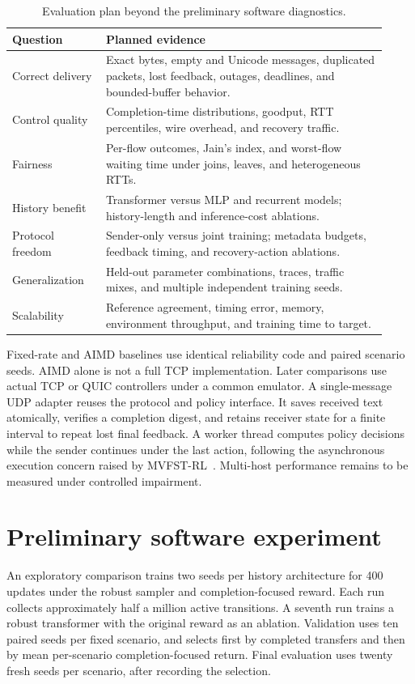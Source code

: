 \documentclass[11pt]{article}
\begin{document}
\begin{table}[ht]
\centering
\small
\begin{tabular}{@{}p{0.23\linewidth}p{0.69\linewidth}@{}}
\toprule
Question & Planned evidence \\
\midrule
Correct delivery & Exact bytes, empty and Unicode messages, duplicated packets,
lost feedback, outages, deadlines, and bounded-buffer behavior. \\
Control quality & Completion-time distributions, goodput, RTT percentiles,
wire overhead, and recovery traffic. \\
Fairness & Per-flow outcomes, Jain's index, and worst-flow waiting time under
joins, leaves, and heterogeneous RTTs. \\
History benefit & Transformer versus MLP and recurrent models; history-length
and inference-cost ablations. \\
Protocol freedom & Sender-only versus joint training; metadata budgets,
feedback timing, and recovery-action ablations. \\
Generalization & Held-out parameter combinations, traces, traffic mixes,
and multiple independent training seeds. \\
Scalability & Reference agreement, timing error, memory, environment throughput,
and training time to target. \\
\bottomrule
\end{tabular}
\caption{Evaluation plan beyond the preliminary software diagnostics.}
\end{table}

Fixed-rate and AIMD baselines use identical reliability code and paired scenario
seeds. AIMD alone is not a full TCP implementation. Later comparisons use actual
TCP or QUIC controllers under a common emulator. A single-message UDP adapter
reuses the protocol and policy interface. It saves received text atomically,
verifies a completion digest, and retains receiver state for a finite interval
to repeat lost final feedback. A worker thread computes policy decisions while
the sender continues under the last action, following the asynchronous execution
concern raised by MVFST-RL~\cite{sivakumar2019mvfst}. Multi-host performance remains
to be measured under controlled impairment.

\section{Preliminary software experiment}
An exploratory comparison trains two seeds per history architecture for 400
updates under the robust sampler and completion-focused reward. Each run collects
approximately half a million active transitions. A seventh run trains a robust
transformer with the original reward as an ablation. Validation uses ten paired
seeds per fixed scenario, and selects first by completed transfers and then by
mean per-scenario completion-focused return. Final evaluation uses twenty fresh
seeds per scenario, after recording the selection.
\end{document}
